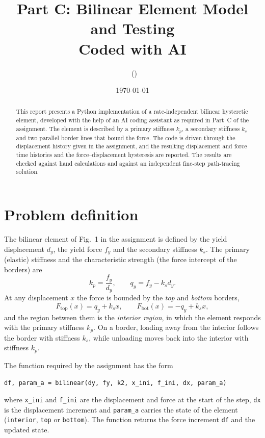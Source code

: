 \documentclass[11pt,a4paper]{article}
\title{\textbf{Part C: Bilinear Element Model and Testing\\Coded with AI}}
\author{\studentname\ifx\studentid\empty\else\ (\studentid)\fi\\[2pt]\small \coursename}
\date{\today}
\begin{document}
\maketitle

\begin{abstract}
This report presents a Python implementation of a rate-independent bilinear hysteretic element,
developed with the help of an AI coding assistant as required in Part~C of the assignment.
The element is described by a primary stiffness $k_p$, a secondary stiffness $k_s$ and two
parallel border lines that bound the force. The code is driven through the displacement history
given in the assignment, and the resulting displacement and force time histories and the
force--displacement hysteresis are reported. The results are checked against hand calculations
and against an independent fine-step path-tracing solution.
\end{abstract}

\section{Problem definition}
The bilinear element of Fig.~1 in the assignment is defined by the yield displacement $d_y$,
the yield force $f_y$ and the secondary stiffness $k_s$. The primary (elastic) stiffness and the
characteristic strength (the force intercept of the borders) are
\begin{equation}
  k_p = \frac{f_y}{d_y}, \qquad q_y = f_y - k_s d_y .
\end{equation}
At any displacement $x$ the force is bounded by the \emph{top} and \emph{bottom} borders,
\begin{equation}
  F_{\text{top}}(x) = q_y + k_s x, \qquad F_{\text{bot}}(x) = -q_y + k_s x ,
  \label{eq:borders}
\end{equation}
and the region between them is the \emph{interior region}, in which the element responds with
the primary stiffness $k_p$. On a border, loading away from the interior follows the border
with stiffness $k_s$, while unloading moves back into the interior with stiffness $k_p$.

The function required by the assignment has the form
\begin{center}
\texttt{df, param\_a = bilinear(dy, fy, k2, x\_ini, f\_ini, dx, param\_a)}
\end{center}
where \texttt{x\_ini} and \texttt{f\_ini} are the displacement and force at the start of the step,
\texttt{dx} is the displacement increment and \texttt{param\_a} carries the state of the element
(\texttt{interior}, \texttt{top} or \texttt{bottom}). The function returns the force increment
\texttt{df} and the updated state.
\end{document}

